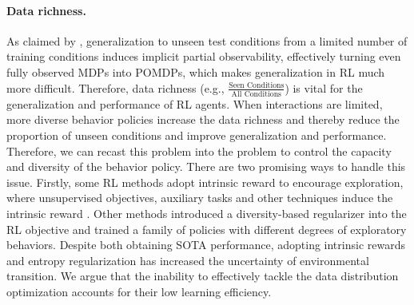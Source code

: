 \documentclass[nohyperref]{article}
\newcommand{\changnan}[1]{{\color{red}{\small\bf\sf [changnan: #1]}}}
\theoremstyle{plain}
\begin{document}
\paragraph{Data richness.} As claimed by \citep{ghosh2021generalization},  generalization to unseen test conditions from a limited number of training conditions induces implicit partial observability, effectively turning even fully observed MDPs into POMDPs, which makes generalization in RL much more difficult. Therefore, data richness (e.g., $\frac{\text{Seen Conditions}}{\text{All Conditions}}$) is vital for the generalization and performance of RL agents.  When interactions are limited, more diverse behavior policies increase the data richness and thereby reduce the proportion of unseen conditions  and  improve generalization and performance.  Therefore, we can recast this problem into the problem to control the  capacity and diversity  of the behavior policy. There are two promising ways to handle this issue. 
Firstly, some RL methods adopt intrinsic reward to encourage exploration, where unsupervised objectives, auxiliary tasks and other techniques induce the intrinsic reward \citep{icm}.
Other methods \citep{agent57} introduced a diversity-based regularizer into the RL objective and trained a family of policies with different degrees of exploratory behaviors.   Despite both obtaining SOTA performance, adopting intrinsic rewards and entropy regularization has increased the uncertainty of environmental transition. We argue that the inability to effectively tackle the  data distribution optimization accounts for their low learning efficiency. 
 

\end{document}
